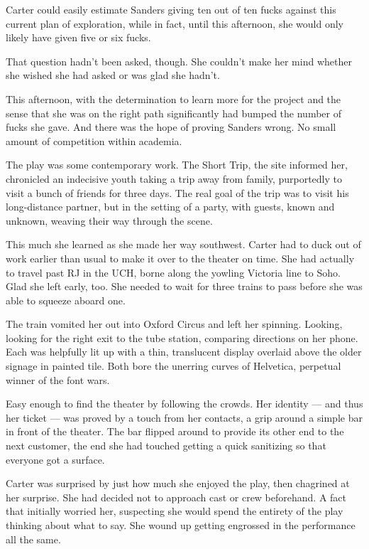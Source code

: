 Carter could easily estimate Sanders giving ten out of ten fucks against this current plan of exploration, while in fact, until this afternoon, she would only likely have given five or six fucks.

That question hadn't been asked, though. She couldn't make her mind whether she wished she had asked or was glad she hadn't.

This afternoon, with the determination to learn more for the project and the sense that she was on the right path significantly had bumped the number of fucks she gave. And there was the hope of proving Sanders wrong. No small amount of competition within academia.

The play was some contemporary work. The Short Trip, the site informed her, chronicled an indecisive youth taking a trip away from family, purportedly to visit a bunch of friends for three days. The real goal of the trip was to visit his long-distance partner, but in the setting of a party, with guests, known and unknown, weaving their way through the scene.

This much she learned as she made her way southwest. Carter had to duck out of work earlier than usual to make it over to the theater on time. She had actually to travel past RJ in the UCH, borne along the yowling Victoria line to Soho. Glad she left early, too. She needed to wait for three trains to pass before she was able to squeeze aboard one.

The train vomited her out into Oxford Circus and left her spinning. Looking, looking for the right exit to the tube station, comparing directions on her phone. Each was helpfully lit up with a thin, translucent display overlaid above the older signage in painted tile. Both bore the unerring curves of Helvetica, perpetual winner of the font wars.

Easy enough to find the theater by following the crowds. Her identity — and thus her ticket — was proved by a touch from her contacts, a grip around a simple bar in front of the theater. The bar flipped around to provide its other end to the next customer, the end she had touched getting a quick sanitizing so that everyone got a surface.

Carter was surprised by just how much she enjoyed the play, then chagrined at her surprise. She had decided not to approach cast or crew beforehand. A fact that initially worried her, suspecting she would spend the entirety of the play thinking about what to say. She wound up getting engrossed in the performance all the same.

